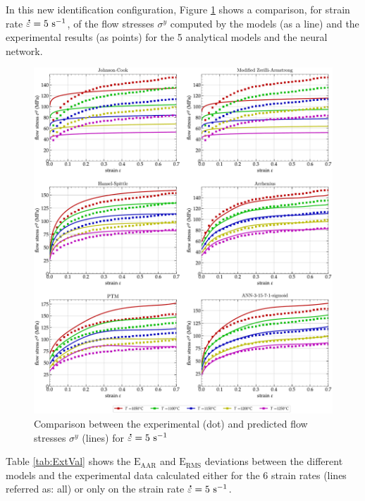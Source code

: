 \documentclass[twoside,english,1p,final,sort&compress]{elsarticle}
\theoremstyle{plain}
\DeclareRobustCommand{\mdot}[1]{\accentset{\mbox{\bfseries .}}{#1}}
\DeclareRobustCommand{\RMSE}{\text{E}_\text{RMS}}
\DeclareRobustCommand{\AARE}{\text{E}_\text{AAR}}
\DeclareRobustCommand{\ps}{\text{s}^{-1}}
\begin{document}
In this new identification configuration, Figure \ref{fig:CompExt} shows a comparison, for strain rate $\mdot\varepsilon=5~\ps$, of the flow stresses $\sigma^y$ computed by the models (as a line) and the experimental results (as points) for the 5 analytical models and the neural network.
\begin{figure}[!ht]
\centering
\includegraphics[width=\columnwidth]
{Figures/CompExt}
\caption{Comparison between the experimental (dot) and predicted flow stresses $\sigma^y$ (lines) for $\mdot\varepsilon=5~\ps$}
\label{fig:CompExt}
\end{figure}
Table \ref{tab:ExtVal} shows the $\AARE$ and $\RMSE$ deviations between the different models and the experimental data calculated either for the 6 strain rates (lines referred as: all) or only on the strain rate $\mdot\varepsilon=5~\ps$.
\end{document}
